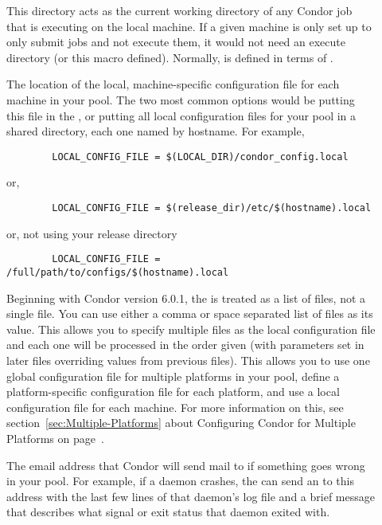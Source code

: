 \begin{description}
\item[] \label{param:Execute} This directory acts as
  the current working directory of any Condor job that is executing on
  the local machine.  If a given machine is only set up to only submit
  jobs and not execute them, it would not need an execute directory
  (or this macro defined).  Normally,  is defined
  in terms of .
  
\item[] \label{param:LocalConfigFile} The
  location of the local, machine-specific configuration
  file for each machine
  in your pool.  The two most common options would be putting this
  file in the , or putting all
  local configuration files for your pool in a shared directory, each one
  named by hostname.  For example,
\begin{verbatim}
        LOCAL_CONFIG_FILE = $(LOCAL_DIR)/condor_config.local
\end{verbatim}
  or,
\begin{verbatim}
        LOCAL_CONFIG_FILE = $(release_dir)/etc/$(hostname).local
\end{verbatim}
  or, not using your release directory
\begin{verbatim}
        LOCAL_CONFIG_FILE = /full/path/to/configs/$(hostname).local
\end{verbatim}
  
  Beginning with Condor version 6.0.1, the 
  is treated as a list of files, not a single file.  You can use
  either a comma or space separated list of files as its value.  This
  allows you to specify multiple files as the local configuration file
  and each one will be processed in the order given (with parameters set in
  later files overriding values from previous files).  This allows
  you to use one global configuration file for multiple platforms
  in your pool,
  define a platform-specific configuration file for each platform, and
  use a local configuration file for each machine.  For more
  information on this, see section~\ref{sec:Multiple-Platforms} about
  Configuring Condor for Multiple Platforms on
  page~\pageref{sec:Multiple-Platforms}.

\item[] \label{param:CondorAdmin} The email
  address that Condor will send mail to if something goes wrong in
  your pool.  For example, if a daemon crashes, the 
  can send an  to this address with the last few lines
  of that daemon's log file and a brief message that describes what
  signal or exit status that daemon exited with.
  

\end{description}
